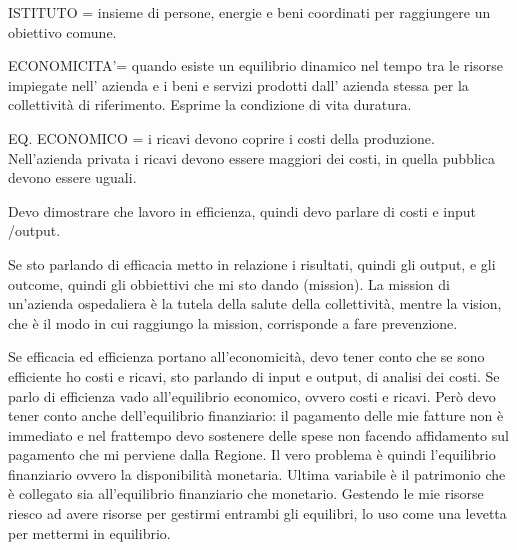 \documentclass[]{article}
\begin{document}
ISTITUTO = insieme di persone, energie e beni coordinati per raggiungere
un obiettivo comune.

ECONOMICITA'= quando esiste un equilibrio dinamico nel tempo tra le
risorse impiegate nell' azienda e i beni e servizi prodotti dall'
azienda stessa per la collettività di riferimento. Esprime la condizione
di vita duratura.

EQ. ECONOMICO = i ricavi devono coprire i costi della produzione.
Nell'azienda privata i ricavi devono essere maggiori dei costi, in
quella pubblica devono essere uguali.

Devo dimostrare che lavoro in efficienza, quindi devo parlare di costi e
input /output.

Se sto parlando di efficacia metto in relazione i risultati, quindi gli
output, e gli outcome, quindi gli obbiettivi che mi sto dando (mission).
La mission di un'azienda ospedaliera è la tutela della salute della
collettività, mentre la vision, che è il modo in cui raggiungo la
mission, corrisponde a fare prevenzione.

Se efficacia ed efficienza portano all'economicità, devo tener conto che
se sono efficiente ho costi e ricavi, sto parlando di input e output, di
analisi dei costi. Se parlo di efficienza vado all'equilibrio economico,
ovvero costi e ricavi. Però devo tener conto anche dell'equilibrio
finanziario: il pagamento delle mie fatture non è immediato e nel
frattempo devo sostenere delle spese non facendo affidamento sul
pagamento che mi perviene dalla Regione. Il vero problema è quindi
l'equilibrio finanziario ovvero la disponibilità monetaria. Ultima
variabile è il patrimonio che è collegato sia all'equilibrio finanziario
che monetario. Gestendo le mie risorse riesco ad avere risorse per
gestirmi entrambi gli equilibri, lo uso come una levetta per mettermi in
equilibrio.
\end{document}

